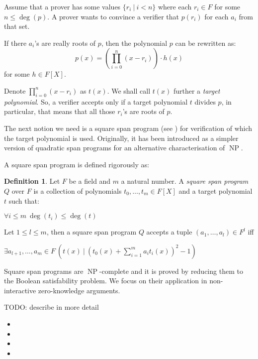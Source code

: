 \documentclass{article}
\theoremstyle{definition}
\newtheorem{definition}{Definition}[section]
\theoremstyle{remark}
\begin{document}
Assume that a prover has some values $\{ r_i \: | \: i < n\}$ where each $r_i \in F$ for some $n \leq \deg(p)$.
A prover wants to convince a verifier that $p(r_i)$ for each $a_i$ from that set.

If there $a_i$'s are really roots of $p$, then the polynomial $p$ can be rewritten as:
\begin{equation}
p(x) = \left( \prod_{i = 0}^n (x - r_i) \right) \cdot h(x)
\end{equation}
for some $h \in F[X]$.

Denote $\prod_{i = 0}^n (x - r_i)$ as $t(x)$. We shall call $t(x)$ further a \emph{target polynomial}. So, a verifier accepts only if a target polynomial $t$ divides $p$, in particular, that means that all those $r_i$'s are roots of $p$.

The next notion we need is a square span program (see \cite{danezis2014square}) for verification of which the target polynomial is used. Originally, it has been introduced as a simpler version of quadratic span programs for an alternative characterisation of $\operatorname{NP}$.

A square span program is defined rigorously as:
\begin{definition}
Let $F$ be a field and $m$ a natural number. A \emph{square span program} $Q$ over $F$ is a collection of polynomials $t_0, \dots, t_m \in F[X]$ and a target polynomial $t$ such that:
\begin{center}
$\forall i \leq m \: \deg(t_i) \leq \deg(t)$
\end{center}

Let $1 \leq l \leq m$, then a square span program $Q$ accepts a tuple $(a_1, \dots, a_l) \in F^l$ iff

\begin{center}
$\exists a_{l + 1}, \dots, a_m \in F \: \left( t(x) \: | \: \left( t_0(x) + \sum \limits_{i = 1}^m a_i t_i(x) \right)^2 - 1 \right)$
\end{center}
\end{definition}

Square span programs are $\operatorname{NP}$-complete and it is proved by reducing them to the Boolean satisfability problem. We focus on their application in non-interactive zero-knowledge arguments.

TODO: describe in more detail

\begin{itemize}
\item
\item
\item
\item
\end{itemize}
\end{document}

